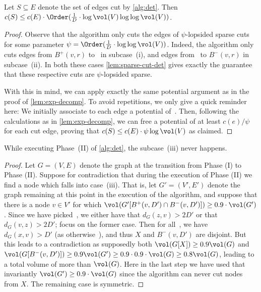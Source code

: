 \begin{lemma} \label{lem:ldd-det-cost}
Let $S \subseteq E$ denote the set of edges cut by \cref{alg:det}. Then $c(S) \leq c(E) \cdot \Order(\frac{1}{D} \cdot \log \vol(V) \log\log \vol(V))$.
\end{lemma}
\begin{proof}
Observe that the algorithm only cuts the edges of $\psi$-lopsided sparse cuts for some parameter $\psi = \Order(\frac{1}{D} \cdot \log\log \vol(V))$. Indeed, the algorithm only cuts edges from $B^+(v, r)$ to~ in subcase~(i), and edges from~ to $B^-(v, r)$ in subcase~(ii). In both these cases \cref{lem:sparse-cut-det} gives exactly the guarantee that these respective cuts are $\psi$-lopsided sparse.

With this in mind, we can apply exactly the same potential argument as in the proof of \cref{lem:exp-decomp}. To avoid repetitions, we only give a quick reminder here: We initially associate to each edge a potential of~. Then, following the calculations as in \cref{lem:exp-decomp}, we can free a potential of at least $c(e) / \psi$ for each cut edge, proving that $c(S) \leq c(E) \cdot \psi \log\vol(V)$ as claimed.
\end{proof}

\begin{lemma} \label{lem:ldd-det-well-defined}
While executing Phase~(II) of \cref{alg:det}, the subcase~(iii) never happens.
\end{lemma}
\begin{proof}
Let $G = (V, E)$ denote the graph at the transition from Phase (I) to Phase (II). Suppose for contradiction that during the execution of Phase (II) we find a node which falls into case~(iii). That is, let $G' = (V', E')$ denote the graph remaining at this point in the execution of the algorithm, and suppose that there is a node $v \in V'$ for which $\vol(G'[B^+(v, D') \cap B^-(v, D')]) \geq 0.9 \cdot \vol(G')$. Since we have picked~, we either have that $d_G(z, v) > 2D'$ or that $d_G(v, z) > 2D'$; focus on the former case. Then for all~, we have $d_G(x, v) > D'$ (as otherwise~), and thus $X$ and $B^-(v, D')$ are disjoint. But this leads to a contradiction as supposedly both $\vol(G[X]) \geq 0.9 \vol(G)$ and $\vol(G[B^-(v, D')]) \geq 0.9 \vol(G') \geq 0.9 \cdot 0.9 \cdot \vol(G) \geq 0.8 \vol(G)$, leading to a total volume of more than $\vol(G)$. Here in the last step we have used that invariantly $\vol(G') \geq 0.9 \cdot \vol(G)$ since the algorithm can never cut nodes from $X$. The remaining case is symmetric.
\end{proof}

